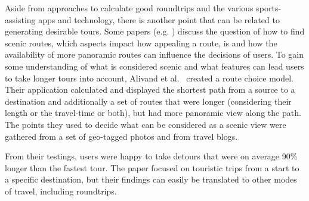 Aside from approaches to calculate good roundtrips and the various sports-assisting apps and technology, there is another point that can be related to generating desirable tours.
Some papers (e.g. \cite{alivand_analyzing_2015}) discuss the question of how to find scenic routes, which aspects impact how appealing a route, is and how the availability of more panoramic routes can influence the decisions of users.
To gain some understanding of what is considered scenic and what features can lead users to take longer tours into account, Alivand et al.\ \cite{alivand_analyzing_2015} created a route choice model.
Their application calculated and displayed the shortest path from a source to a destination and additionally a set of routes that were longer (considering their length or the travel-time or both), but had more panoramic view along the path.
The points they used to decide what can be considered as a scenic view were gathered from a set of geo-tagged photos and from travel blogs.

From their testings, users were happy to take detours that were on average 90\% longer than the fastest tour.
The paper focused on touristic trips from a start to a specific destination, but their findings can easily be translated to other modes of travel, including roundtrips.


